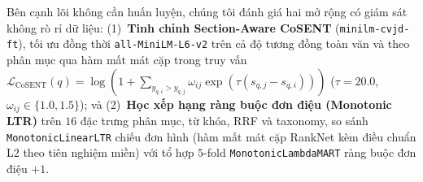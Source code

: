 Bên cạnh lõi không cần huấn luyện, chúng tôi đánh giá hai mở rộng có giám sát không rò rỉ dữ liệu: (1)~\textbf{Tinh chỉnh Section-Aware CoSENT} (\texttt{minilm-cvjd-ft}), tối ưu đồng thời \texttt{all-MiniLM-L6-v2} trên cả độ tương đồng toàn văn và theo phân mục qua hàm mất mát cặp trong truy vấn $\mathcal{L}_{\text{CoSENT}}(q) = \log(1 + \sum_{y_{q,i} > y_{q,j}} \omega_{ij} \exp(\tau(s_{q,j} - s_{q,i})))$ ($\tau = 20.0$, $\omega_{ij} \in \{1.0, 1.5\}$); và (2)~\textbf{Học xếp hạng ràng buộc đơn điệu (Monotonic LTR)} trên $16$ đặc trưng phân mục, từ khóa, RRF và taxonomy, so sánh \texttt{MonotonicLinearLTR} chiếu đơn hình (hàm mất mát cặp RankNet kèm điều chuẩn L2 theo tiên nghiệm miền) với tổ hợp $5$-fold \texttt{MonotonicLambdaMART} ràng buộc đơn điệu $+1$.
